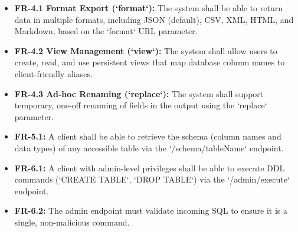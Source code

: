 \documentclass[12pt, a4paper]{report}
\begin{document}
\begin{description}
\begin{itemize}
        \end{itemize}
    \item[FR-4: Data Transformation]
        \begin{itemize}
            \item \textbf{FR-4.1 Format Export (`format`):} The system shall be able to return data in multiple formats, including JSON (default), CSV, XML, HTML, and Markdown, based on the `format` URL parameter.
            \item \textbf{FR-4.2 View Management (`view`):} The system shall allow users to create, read, and use persistent views that map database column names to client-friendly aliases.
            \item \textbf{FR-4.3 Ad-hoc Renaming (`replace`):} The system shall support temporary, one-off renaming of fields in the output using the `replace` parameter.
        \end{itemize}
    \item[FR-5: Schema Discovery]
        \begin{itemize}
            \item \textbf{FR-5.1:} A client shall be able to retrieve the schema (column names and data types) of any accessible table via the `/schema/{tableName}` endpoint.
        \end{itemize}
    \item[FR-6: Administrative Functions]
        \begin{itemize}
            \item \textbf{FR-6.1:} A client with admin-level privileges shall be able to execute DDL commands (`CREATE TABLE`, `DROP TABLE`) via the `/admin/execute` endpoint.
            \item \textbf{FR-6.2:} The admin endpoint must validate incoming SQL to ensure it is a single, non-malicious command.
        \end{itemize}
\end{description}
\end{document}
